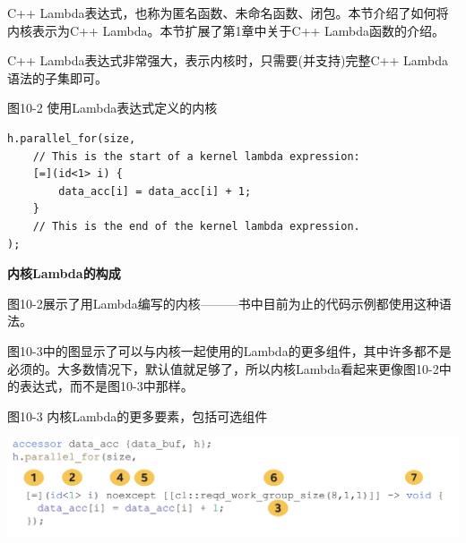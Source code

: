 C++ Lambda表达式，也称为匿名函数、未命名函数、闭包。本节介绍了如何将内核表示为C++ Lambda。本节扩展了第1章中关于C++ Lambda函数的介绍。\par

C++ Lambda表达式非常强大，表示内核时，只需要(并支持)完整C++ Lambda语法的子集即可。\par

\hspace*{\fill} \par %
图10-2 使用Lambda表达式定义的内核
\begin{lstlisting}[caption={}]
h.parallel_for(size,
	// This is the start of a kernel lambda expression:
	[=](id<1> i) {
		data_acc[i] = data_acc[i] + 1;
	}
	// This is the end of the kernel lambda expression.
);
\end{lstlisting}

\hspace*{\fill} \par %
\textbf{内核Lambda的构成}

图10-2展示了用Lambda编写的内核———书中目前为止的代码示例都使用这种语法。\par

图10-3中的图显示了可以与内核一起使用的Lambda的更多组件，其中许多都不是必须的。大多数情况下，默认值就足够了，所以内核Lambda看起来更像图10-2中的表达式，而不是图10-3中那样。\par

\hspace*{\fill} \par %
图10-3 内核Lambda的更多要素，包括可选组件
\begin{center}
	\includegraphics[width=1.0\textwidth]{content/chapter-10/images/2}
\end{center}

